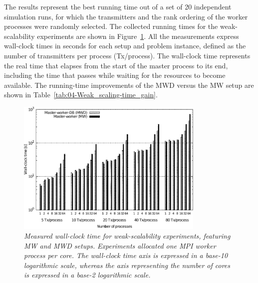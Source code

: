 The results represent the best running time out of a set of 20 independent
simulation runs, for which the transmitters and the rank ordering
of the worker processes were randomly selected. The collected running
times for the weak-scalability experiments are shown in Figure~\ref{fig:04-Weak_scalability_time}.
All the measurements express wall-clock times in seconds for each
setup and problem instance, defined as the number of transmitters
per process (Tx/process). The wall-clock time represents the real
time that elapses from the start of the master process to its end,
including the time that passes while waiting for the resources to
become available. The running-time improvements of the MWD versus
the MW setup are shown in Table~\ref{tab:04-Weak_scaling-time_gain}.

\begin{figure}
\centering

\includegraphics[width=0.8\textwidth]{04-framework_design_and_implementation/img/weak_scaling-time_plot}

\caption{\textit{\emph{Measured wall-clock time for weak-scalability experiments,
featuring MW and MWD setups.}}\textit{ }\textit{\emph{Experiments
allocated one MPI worker process per core. The wall-clock time axis
is expressed in a base-10 logarithmic scale, whereas the axis representing
the number of cores is expressed in a base-2 logarithmic scale.\label{fig:04-Weak_scalability_time}}}}
\end{figure}


